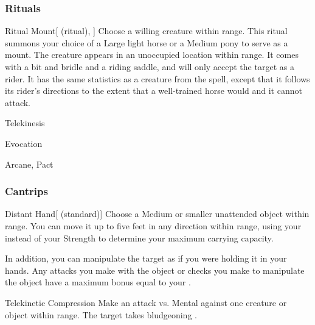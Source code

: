 \subsubsection{Rituals}


\lowercase{\hypertarget{spell:Ritual Mount}{}}\label{spell:Ritual Mount}
\begin{attuneability}[\nth{2}]{\hypertarget{spell:Ritual Mount}{Ritual Mount}}[ (ritual), ]
Choose a willing creature within \rngclose range.
This ritual summons your choice of a Large light horse or a Medium pony to serve as a mount.
The creature appears in an unoccupied location within \rngclose range.
It comes with a bit and bridle and a riding saddle, and will only accept the target as a rider.
It has the same statistics as a creature from the  spell, except that it follows its rider's directions to the extent that a well-trained horse would and it cannot attack.
\end{attuneability}
\vspace{0.25em}


\newpage
\begin{spellsection}{Telekinesis}

\begin{spellheader}
\end{spellheader}


 Evocation

 Arcane, Pact

\subsubsection{Cantrips}


\begin{freeability}{Distant Hand}[ (standard)]
Choose a Medium or smaller unattended object within \rngclose range.
You can move it up to five feet in any direction within range, using your  instead of your Strength to determine your maximum carrying capacity.

In addition, you can manipulate the target as if you were holding it in your hands.
Any attacks you make with the object or checks you make to manipulate the object have a maximum bonus equal to your .
\end{freeability}


\begin{freeability}{Telekinetic Compression}
Make an attack vs. Mental against one creature or object within \rngmed range.
\hit The target takes bludgeoning .
\end{freeability}

\end{spellsection}


